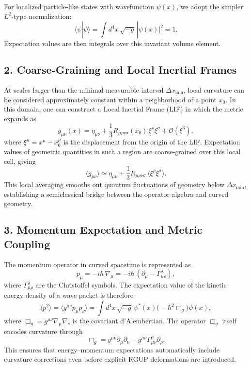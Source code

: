 \documentclass[11pt,oneside]{book}
\numberwithin{equation}{chapter}
\begin{document}
For localized particle-like states with wavefunction $\psi(x)$, we adopt the simpler $L^2$-type normalization:
\begin{equation}
\langle \psi | \psi \rangle
= \int d^4x\,\sqrt{-g}\,|\psi(x)|^2 = 1.
\end{equation}
Expectation values are then integrals over this invariant volume element.

\subsection*{2. Coarse-Graining and Local Inertial Frames}

At scales larger than the minimal measurable interval $\Delta x_{\min}$, local curvature can be considered approximately constant within a neighborhood of a point $x_0$.  
In this domain, one can construct a Local Inertial Frame (LIF) in which the metric expands as
\begin{equation}
g_{\mu\nu}(x)
= \eta_{\mu\nu}
+ \frac{1}{3}R_{\mu\rho\nu\sigma}(x_0)\,
\xi^\rho\xi^\sigma
+ \mathcal{O}(\xi^3),
\end{equation}
where $\xi^\mu = x^\mu - x_0^\mu$ is the displacement from the origin of the LIF.  
Expectation values of geometric quantities in such a region are coarse-grained over this local cell, giving
\begin{equation}
\langle g_{\mu\nu} \rangle
\simeq \eta_{\mu\nu}
+ \frac{1}{3}R_{\mu\rho\nu\sigma}\,
\langle \xi^\rho \xi^\sigma \rangle.
\end{equation}
This local averaging smooths out quantum fluctuations of geometry below $\Delta x_{\min}$, establishing a semiclassical bridge between the operator algebra and curved geometry.

\subsection*{3. Momentum Expectation and Metric Coupling}

The momentum operator in curved spacetime is represented as
\begin{equation}
p_\mu = -i\hbar\,\nabla_\mu
= -i\hbar\,(\partial_\mu - \Gamma^\lambda_{\mu\rho}),
\end{equation}
where $\Gamma^\lambda_{\mu\rho}$ are the Christoffel symbols.  
The expectation value of the kinetic energy density of a wave packet is therefore
\begin{equation}
\langle p^2 \rangle
= \langle g^{\mu\nu} p_\mu p_\nu \rangle
= \int d^4x\,\sqrt{-g}\,
\psi^*(x)
\big(-\hbar^2 \Box_g\big)
\psi(x),
\end{equation}
where $\Box_g = g^{\mu\nu}\nabla_\mu\nabla_\nu$ is the covariant d’Alembertian.  
The operator $\Box_g$ itself encodes curvature through
\begin{equation}
\Box_g = g^{\mu\nu}\partial_\mu\partial_\nu
- g^{\mu\nu}\Gamma^\rho_{\mu\nu}\partial_\rho.
\end{equation}
This ensures that energy–momentum expectations automatically include curvature corrections even before explicit RGUP deformations are introduced.
\end{document}
